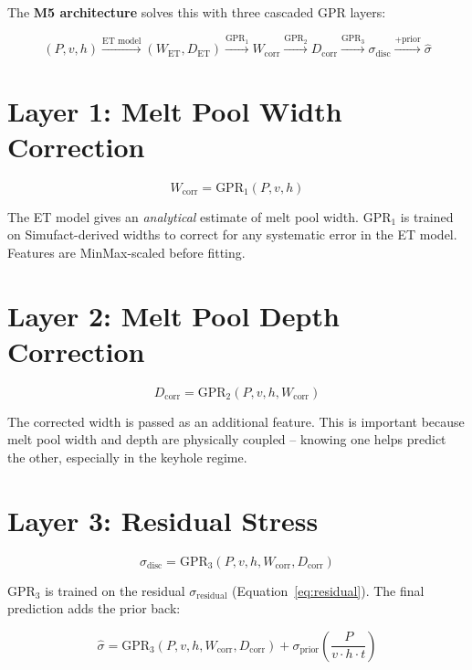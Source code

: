 \documentclass[12pt,a4paper]{report}
\begin{document}
The \textbf{M5 architecture} solves this with three cascaded GPR layers:

\begin{equation}
(P, v, h) \xrightarrow{\text{ET model}} (W_{\text{ET}}, D_{\text{ET}})
\xrightarrow{\text{GPR}_1} W_{\text{corr}}
\xrightarrow{\text{GPR}_2} D_{\text{corr}}
\xrightarrow{\text{GPR}_3} \sigma_{\text{disc}}
\xrightarrow{+ \text{prior}} \hat{\sigma}
\end{equation}

\section{Layer 1: Melt Pool Width Correction}

\begin{equation}
W_{\text{corr}} = \text{GPR}_1(P, v, h)
\end{equation}

The ET model gives an \textit{analytical} estimate of melt pool width. GPR$_1$ is trained on Simufact-derived widths to correct for any systematic error in the ET model. Features are MinMax-scaled before fitting.

\section{Layer 2: Melt Pool Depth Correction}

\begin{equation}
D_{\text{corr}} = \text{GPR}_2(P, v, h, W_{\text{corr}})
\end{equation}

The corrected width is passed as an additional feature. This is important because melt pool width and depth are physically coupled -- knowing one helps predict the other, especially in the keyhole regime.

\section{Layer 3: Residual Stress}

\begin{equation}
\sigma_{\text{disc}} = \text{GPR}_3(P, v, h, W_{\text{corr}}, D_{\text{corr}})
\end{equation}

GPR$_3$ is trained on the residual $\sigma_{\text{residual}}$ (Equation~\ref{eq:residual}). The final prediction adds the prior back:

\begin{equation}
\hat{\sigma} = \text{GPR}_3(P, v, h, W_{\text{corr}}, D_{\text{corr}}) + \sigma_{\text{prior}}\!\left(\frac{P}{v \cdot h \cdot t}\right)
\label{eq:final_pred}
\end{equation}
\end{document}

